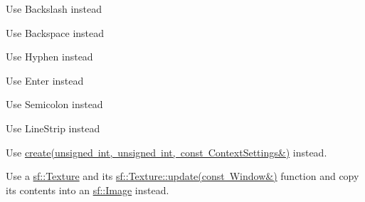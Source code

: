 \begin{DoxyRefList}
Use Backslash instead  
\item[Membre \mbox{\hyperlink{classsf_1_1_keyboard_acb4cacd7cc5802dec45724cf3314a142a33aeaab900abcd01eebf2fcc4f6d97e2}{sf\+::Keyboard\+::Back\+Space}} ]\label{deprecated__deprecated000025}%
%
Use Backspace instead  
\item[Membre \mbox{\hyperlink{classsf_1_1_keyboard_acb4cacd7cc5802dec45724cf3314a142a401a183dcfde0a06cb60fe6c91fa1e39}{sf\+::Keyboard\+::Dash}} ]\label{deprecated__deprecated000024}%
%
Use Hyphen instead  
\item[Membre \mbox{\hyperlink{classsf_1_1_keyboard_acb4cacd7cc5802dec45724cf3314a142ac291de81bdee518d636bc359f2ca77de}{sf\+::Keyboard\+::Return}} ]\label{deprecated__deprecated000028}%
%
Use Enter instead  
\item[Membre \mbox{\hyperlink{classsf_1_1_keyboard_acb4cacd7cc5802dec45724cf3314a142a460ab09a36f9ed230504b89b9815de88}{sf\+::Keyboard\+::Semi\+Colon}} ]\label{deprecated__deprecated000027}%
%
Use Semicolon instead  
\item[Membre \mbox{\hyperlink{group__graphics_gga5ee56ac1339984909610713096283b1ba5b09910f5d0f39641342184ccd0d1de3}{sf\+::Lines\+Strip}} ]\label{deprecated__deprecated000006}%
%
Use Line\+Strip instead  
\item[Membre \mbox{\hyperlink{classsf_1_1_render_texture_aaec1fb8ee77844da50b0143cb41c8a71}{sf\+::Render\+Texture\+::create}} (unsigned int width, unsigned int height, bool depth\+Buffer)]\label{deprecated__deprecated000009}%
%
Use \mbox{\hyperlink{classsf_1_1_render_texture_a49b7b723a80f89bc409a942364351dc3}{create(unsigned int, unsigned int, const Context\+Settings\&)}} instead. 
\item[Membre \mbox{\hyperlink{classsf_1_1_render_window_a370137abe81f6b7d62b600ceeccd54d3}{sf\+::Render\+Window\+::capture}} () const]\label{deprecated__deprecated000010}%
%
 Use a \mbox{\hyperlink{classsf_1_1_texture}{sf\+::\+Texture}} and its \mbox{\hyperlink{classsf_1_1_texture_ad3cceef238f7d5d2108a98dd38c17fc5}{sf\+::\+Texture\+::update(const Window\&)}} function and copy its contents into an \mbox{\hyperlink{classsf_1_1_image}{sf\+::\+Image}} instead.  
\item[Membre \mbox{\hyperlink{classsf_1_1_shader_a4d6ec78f6de1a0a2146c93ab09d7d762}{sf\+::Shader\+::set\+Parameter}} (const std\+::string \&name, float x)]\label{deprecated__deprecated000011}%

\end{DoxyRefList}
